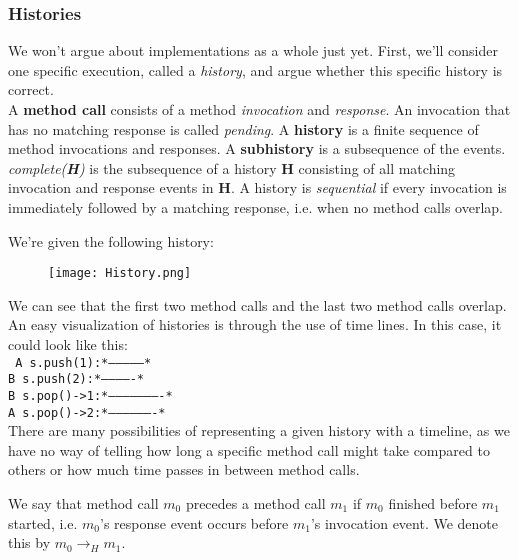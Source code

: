 \documentclass[main]{subfiles}
\begin{document}
\subsubsection{Histories}
We won't argue about implementations as a whole just yet. First, we'll consider one specific execution, called a \textit{history}, and argue whether this specific history is correct.\\[3mm]
A \textbf{method call} consists of a method \textit{invocation} and \textit{response}. An invocation that has no matching response is called \textit{pending}. A \textbf{history} is a finite sequence of method invocations and responses. A \textbf{subhistory} is a subsequence of the events. \textit{complete(\textbf{H})} is the subsequence of a history \textbf{H} consisting of all matching invocation and response events in \textbf{H}. A history is \textit{sequential} if every invocation is immediately followed by a matching response, i.e. when no method calls overlap.\\[3mm]
\begin{example}
    We're given the following history:
    \begin{figure}[H]
        \centering
        \texttt{[image: History.png]}
    \end{figure}
    \noindent We can see that the first two method calls and the last two method calls overlap.\\
    An easy visualization of histories is through the use of time lines. In this case, it could look like this:\\[3mm]
    \texttt{
        A s.push(1):\hspace{6pt}*--------------*\\
        B s.push(2):\hspace{30pt}*-------------*\\
        B s.pop()->1:\hspace{170pt}*----------------------*\\
        A s.pop()->2:\hspace{200pt}*-------------------*\\
    }
    There are many possibilities of representing a given history with a timeline, as we have no way of telling how long a specific method call might take compared to others or how much time passes in between method calls.
\end{example}
We say that method call $m_0$ precedes a method call $m_1$ if $m_0$ finished before $m_1$ started, i.e. $m_0$'s response event occurs before $m_1$'s invocation event. We denote this by $m_0 \rightarrow_H m_1$.
\end{document}
